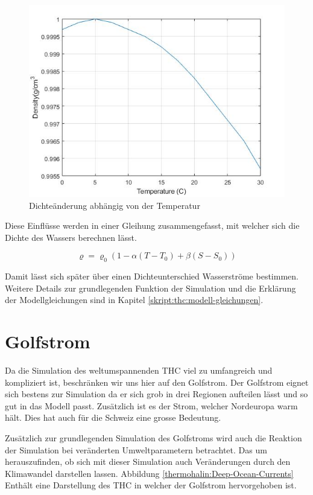 \begin{figure}
	\centering
	\includegraphics[width=12cm]{thermohalin/Code/graphs/graph_temp.jpg}
	\caption{Dichteänderung abhängig von der Temperatur\label{thermohalin:graph-temp}}
\end{figure}

 Diese Einflüsse werden in einer Gleihung zusammengefasst, mit welcher sich die Dichte des Wassers berechnen lässt.
 

\begin{equation}
\varrho
=
\varrho_0(1-\alpha(T-T_0)+\beta(S-S_0))
\label{thermohalin:Dichte}
\end{equation} 

Damit lässt sich später über einen Dichteunterschied Wasserströme bestimmen.
Weitere Details zur grundlegenden Funktion der Simulation und die Erklärung der Modellgleichungen sind in Kapitel \ref{skript:thc:modell-gleichungen}.


\section{Golfstrom}

Da die Simulation des weltumspannenden THC viel zu umfangreich und kompliziert ist, beschränken wir uns hier auf den Golfstrom.
Der Golfstrom eignet sich bestens zur Simulation da er sich grob in drei Regionen aufteilen lässt und so gut in das Modell passt. Zusätzlich ist es der Strom, welcher Nordeuropa warm hält. Dies hat auch für die Schweiz eine grosse Bedeutung.

Zusätzlich zur grundlegenden Simulation des Golfstroms wird auch die Reaktion der Simulation bei veränderten Umweltparametern betrachtet. Das um herauszufinden, ob sich mit dieser Simulation auch Veränderungen durch den Klimawandel darstellen lassen. Abbildung \ref{thermohalin:Deep-Ocean-Currents} Enthält eine Darstellung des THC in welcher der Golfstrom hervorgehoben ist. 


